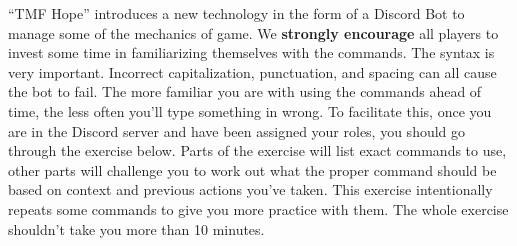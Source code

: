 \documentclass[green]{TMFHope}
\begin{document}
\name{\gDiscord{}}

``TMF Hope'' introduces a new technology in the form of a Discord Bot to manage some of the mechanics of game. We \textbf{strongly encourage} all players to invest some time in familiarizing themselves with the commands. The syntax is very important. Incorrect capitalization, punctuation, and spacing can all cause the bot to fail. The more familiar you are with using the commands ahead of time, the less often you'll type something in wrong. To facilitate this, once you are in the Discord server and have been assigned your roles, you should go through the exercise below. Parts of the exercise will list exact commands to use, other parts will challenge you to work out what the proper command should be based on context and previous actions you've taken. This exercise intentionally repeats some commands to give you more practice with them. The whole exercise shouldn't take you more than 10 minutes.
\end{document}

